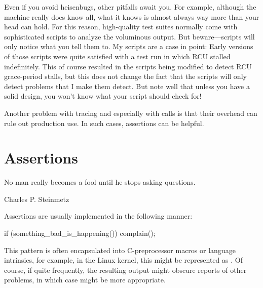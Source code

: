Even if you avoid heisenbugs, other pitfalls await you.
For example, although the machine really does know all,
what it knows is almost always way more than your head can hold.
For this reason, high-quality test suites normally come with sophisticated
scripts to analyze the voluminous output.
But beware---scripts will only notice what you tell them to.
My  scripts are a case in point:
Early versions of those scripts were quite satisfied with a test run
in which RCU  stalled indefinitely.
This of course resulted in the scripts being modified to detect RCU
grace-period stalls, but this does not change the fact that the scripts
will only detect problems that I make them detect.
But note well that unless you have a solid design, you won't know what
your script should check for!

Another problem with tracing and especially with  calls
is that their overhead can rule out production use.
In such cases, assertions can be helpful.

\section{Assertions}
\label{sec:debugging:Assertions}
%
\epigraph{No man really becomes a fool until he stops asking questions.}
	 {Charles P. Steinmetz}

Assertions are usually implemented in the following manner:

\begin{VerbatimN}
if (something_bad_is_happening())
	complain();
\end{VerbatimN}

This pattern is often encapsulated into C-preprocessor macros or
language intrinsics, for example, in the Linux kernel, this might
be represented as .
Of course, if  quite frequently,
the resulting output might obscure reports of other problems,
in which case
 might be more appropriate.

\QuickQuizEnd

